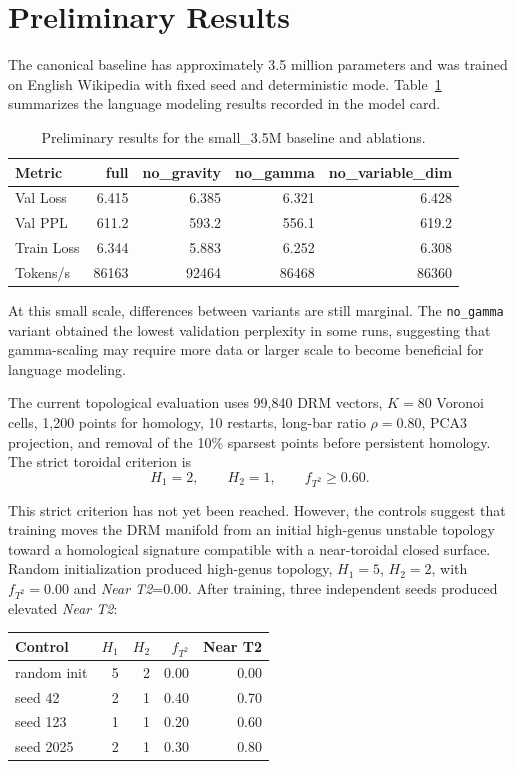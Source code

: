 \section{Preliminary Results}
\label{sec:results}

The canonical baseline has approximately 3.5 million parameters and was trained
on English Wikipedia with fixed seed and deterministic mode. Table~\ref{tab:language}
summarizes the language modeling results recorded in the model card.

\begin{table}[h]
\centering
\begin{tabular}{lrrrr}
\toprule
Metric & full & no\_gravity & no\_gamma & no\_variable\_dim \\
\midrule
Val Loss & 6.415 & 6.385 & 6.321 & 6.428 \\
Val PPL & 611.2 & 593.2 & 556.1 & 619.2 \\
Train Loss & 6.344 & 5.883 & 6.252 & 6.308 \\
Tokens/s & 86163 & 92464 & 86468 & 86360 \\
\bottomrule
\end{tabular}
\caption{Preliminary results for the small\_3.5M baseline and ablations.}
\label{tab:language}
\end{table}

At this small scale, differences between variants are still marginal. The
\texttt{no\_gamma} variant obtained the lowest validation perplexity in some
runs, suggesting that gamma-scaling may require more data or larger scale to
become beneficial for language modeling.

The current topological evaluation uses 99,840 DRM vectors, $K=80$ Voronoi
cells, 1,200 points for homology, 10 restarts, long-bar ratio $\rho=0.80$, PCA3
projection, and removal of the 10\% sparsest points before persistent homology.
The strict toroidal criterion is
\begin{equation}
  H_1=2,\qquad H_2=1,\qquad f_{T^2}\geq 0.60.
\end{equation}

This strict criterion has not yet been reached. However, the controls suggest
that training moves the DRM manifold from an initial high-genus unstable
topology toward a homological signature compatible with a near-toroidal closed
surface. Random initialization produced high-genus topology, $H_1=5$, $H_2=2$,
with $f_{T^2}=0.00$ and \emph{Near T2}=0.00. After training, three independent
seeds produced elevated \emph{Near T2}:
\begin{center}
\begin{tabular}{lrrrr}
\toprule
Control & $H_1$ & $H_2$ & $f_{T^2}$ & Near T2 \\
\midrule
random init & 5 & 2 & 0.00 & 0.00 \\
seed 42 & 2 & 1 & 0.40 & 0.70 \\
seed 123 & 1 & 1 & 0.20 & 0.60 \\
seed 2025 & 2 & 1 & 0.30 & 0.80 \\
\bottomrule
\end{tabular}
\end{center}

